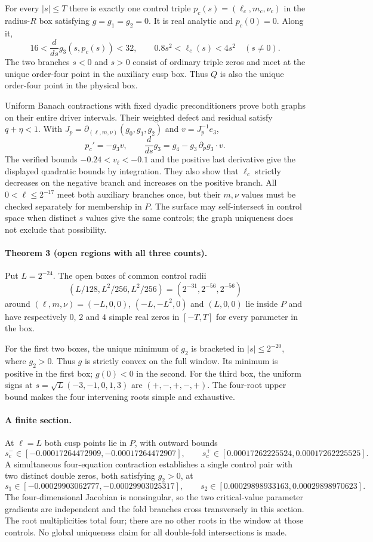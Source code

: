 For every $|s|\leq T$ there is exactly one control triple
$p_c(s)=(\ell_c,m_c,\nu_c)$ in the radius-$R$ box satisfying
$g=g_1=g_2=0$. It is real analytic and $p_c(0)=0$. Along it,
\[
 16<\frac{d}{ds}g_3(s,p_c(s))<32,\qquad
 0.8s^2<\ell_c(s)<4s^2\quad(s\ne0).
\]
The two branches $s<0$ and $s>0$ consist of ordinary triple zeros
and meet at the unique order-four point in the auxiliary cusp box.
Thus $Q$ is also the unique order-four point in the physical box.

Uniform Banach contractions with fixed dyadic preconditioners prove
both graphs on their entire driver intervals. Their weighted defect
and residual satisfy $q+\eta<1$. With
$J_p=\partial_{(\ell,m,\nu)}(g_0,g_1,g_2)$ and $v=J_p^{-1}e_3$,
\[
 p_c'=-g_3v,\qquad
 \frac{d}{ds}g_3=g_4-g_3\,\partial_p g_3\cdot v.
\]
The verified bounds $-0.24<v_\ell<-0.1$ and the positive last
derivative give the displayed quadratic bounds by integration.
They also show that $\ell_c$ strictly decreases on the negative
branch and increases on the positive branch. All
$0<\ell\leq2^{-17}$ meet both auxiliary branches once, but their
$m,\nu$ values must be checked separately for membership in $P$.
The surface may self-intersect in control space when distinct $s$
values give the same controls; the graph uniqueness does not exclude
that possibility.

\paragraph{Theorem 3 (open regions with all three counts).}
Put $L=2^{-24}$. The open boxes of common control radii
\[
 (L/128,L^2/256,L^2/256)=(2^{-31},2^{-56},2^{-56})
\]
around $(\ell,m,\nu)=(-L,0,0)$, $(-L,-L^2,0)$ and $(L,0,0)$
lie inside $P$ and have respectively $0$, $2$ and $4$ simple real
zeros in $[-T,T]$ for every parameter in the box.

For the first two boxes, the unique minimum of $g_2$ is bracketed
in $|s|\leq2^{-20}$, where $g_2>0$. Thus $g$ is strictly convex
on the full window. Its minimum is positive in the first box;
$g(0)<0$ in the second. For the third box, the uniform signs at
$s=\sqrt L(-3,-1,0,1,3)$ are $(+,-,+,-,+)$. The four-root upper
bound makes the four intervening roots simple and exhaustive.

\paragraph{A finite section.}
At $\ell=L$ both cusp points lie in $P$, with outward bounds
\[
 s_c^-\in[-0.00017264472909,-0.00017264472907],\qquad
 s_c^+\in[0.00017262225524,0.00017262225525].
\]
A simultaneous four-equation contraction establishes a single
control pair with two distinct double zeros, both satisfying $g_2>0$,
at
\[
 s_1\in[-0.00029903062777,-0.00029903025317],\qquad
 s_2\in[0.00029898933163,0.00029898970623].
\]
The four-dimensional Jacobian is nonsingular, so the two critical-value
parameter gradients are independent and the fold branches cross
transversely in this section. The root multiplicities total four;
there are no other roots in the window at those controls. No global
uniqueness claim for all double-fold intersections is made.

